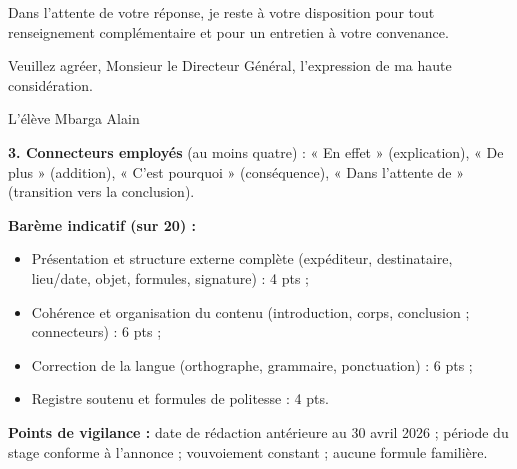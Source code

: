 \documentclass[11pt]{article}
\begin{document}
\begin{corrige}
Dans l'attente de votre réponse, je reste à votre disposition pour tout renseignement complémentaire et pour un entretien à votre convenance.

Veuillez agréer, Monsieur le Directeur Général, l'expression de ma haute considération.

\begin{flushright}L'élève Mbarga Alain\end{flushright}

\textbf{3. Connecteurs employés} (au moins quatre) : « En effet » (explication), « De plus » (addition), « C'est pourquoi » (conséquence), « Dans l'attente de » (transition vers la conclusion).

\textbf{Barème indicatif (sur 20) :}
\begin{itemize}
\item Présentation et structure externe complète (expéditeur, destinataire, lieu/date, objet, formules, signature) : 4 pts ;
\item Cohérence et organisation du contenu (introduction, corps, conclusion ; connecteurs) : 6 pts ;
\item Correction de la langue (orthographe, grammaire, ponctuation) : 6 pts ;
\item Registre soutenu et formules de politesse : 4 pts.
\end{itemize}
\textbf{Points de vigilance :} date de rédaction antérieure au 30 avril 2026 ; période du stage conforme à l'annonce ; vouvoiement constant ; aucune formule familière.
\end{corrige}
\end{document}
